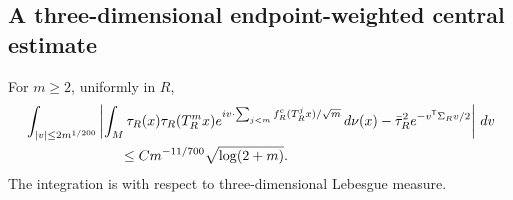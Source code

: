 \subsection{A three-dimensional endpoint-weighted central estimate}
\begin{lemma}
\label{lem:two-roof-central-comparison}
For $m\ge2$, uniformly in $R$,
\begin{align}
 &\int_{|v|\le2m^{1/200}}\left|
 \int_M\tau_R(x)\tau_R(T_R^mx)
       e^{iv\cdot\sum_{j<m}f^{\rm c}_R(T_R^jx)/\sqrt m}\,d\nu(x)
       -\bar\tau_R^2e^{-v^{\mathsf T}\Sigma_Rv/2}
 \right|\,dv\notag\\
 &\hspace{24mm}\le C m^{-11/700}\sqrt{\log(2+m)}.
 \label{eq:two-roof-central-comparison}
\end{align}
The integration is with respect to three-dimensional Lebesgue measure.
\end{lemma}
